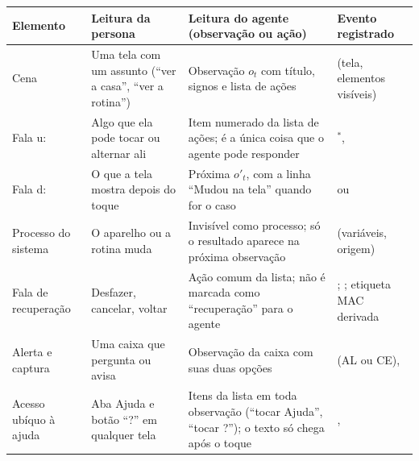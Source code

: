 \begin{tabularx}{\textwidth}{@{}P{2.4cm}YYP{3.6cm}@{}}
\toprule
\textbf{Elemento} & \textbf{Leitura da persona} & \textbf{Leitura do agente (observação ou ação)} & \textbf{Evento registrado} \\
\midrule
Cena & Uma tela com um assunto (``ver a casa'', ``ver a rotina'') & Observação $o_t$ com título, signos e lista de ações &  (tela, elementos visíveis) \\
Fala u: & Algo que ela pode tocar ou alternar ali & Item numerado da lista de ações; é a única coisa que o agente pode responder & $^*$,  \\
Fala d: & O que a tela mostra depois do toque & Próxima $o'_t$, com a linha ``Mudou na tela'' quando for o caso &  ou  \\
Processo do sistema & O aparelho ou a rotina muda & Invisível como processo; só o resultado aparece na próxima observação &  (variáveis, origem) \\
Fala de recuperação & Desfazer, cancelar, voltar & Ação comum da lista; não é marcada como ``recuperação'' para o agente & ; ; etiqueta MAC derivada \\
Alerta e captura & Uma caixa que pergunta ou avisa & Observação da caixa com suas duas opções &  (AL ou CE),  \\
Acesso ubíquo à ajuda & Aba Ajuda e botão ``?'' em qualquer tela & Itens da lista em toda observação (``tocar Ajuda'', ``tocar ?''); o texto só chega após o toque & ,  \\
\bottomrule
\end{tabularx}
